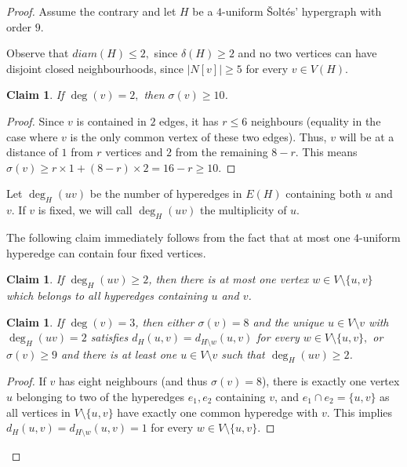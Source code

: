 \documentclass[a4paper,11pt]{article}
\newcommand*{\abs}[1]{\lvert #1\rvert}
\newcommand{\diam}{diam}
\newtheorem{claim}[defi]{Claim}
\newcommand*{\myproofname}{Proof}
\newenvironment{claimproof}[1][\myproofname]{\begin{proof}[#1]\renewcommand*{\qedsymbol}{\(\diamondsuit\)}}{\end{proof}}
\begin{document}
\begin{proof}
    Assume the contrary and let $H$ be a $4$-uniform \v Solt\'es' hypergraph with order $9$.

    Observe that $\diam(H)\le 2,$ since $\delta(H)\ge 2$ and no two vertices can have disjoint closed neighbourhoods, since $\abs{N[v]}\ge 5$ for every $v\in V(H).$ 


    \begin{claim}\label{clm:claimdeg2}
        If $\deg(v)=2,$ then $\sigma(v)\ge 10$. 
    \end{claim}
    \begin{claimproof}
        Since $v$ is contained in $2$ edges, it has $r \le 6$ neighbours (equality in the case where $v$ is the only common vertex of these two edges). Thus, $v$ will be at a distance of $1$ from $r$ vertices and $2$ from the remaining $8-r$. This means $\sigma(v)\ge r\times 1+(8-r)\times2=16-r \ge 10$.
    \end{claimproof}

    Let $\deg_H(uv)$ be the number of hyperedges in $E(H)$ containing both $u$ and $v$. If $v$ is fixed, we will call $\deg_H(uv)$ the multiplicity of $u$.

    
    The following claim immediately follows from the fact that at most one $4$-uniform hyperedge can contain four fixed vertices.

\begin{claim}\label{clm:deg(uv)gexuv-1}
    If $\deg_H(uv)\ge 2$, then there is at most one vertex $w \in V \setminus \{u,v\}$ which belongs to all hyperedges containing $u$ and $v$.
\end{claim}

    \begin{claim}\label{clm:claimdeg3}
        If $\deg(v)=3$, then either $\sigma(v)=8$ and the unique $u \in V \setminus v$ with $\deg_H(uv)= 2$ satisfies $d_H(u,v)=d_{H \setminus w}(u,v)$ for every $w \in V \setminus \{u,v\},$ or $\sigma(v)\ge 9$ and there is at least one $u \in V \setminus v$ such that $\deg_H(uv)\ge 2$.
    \end{claim}
    \begin{claimproof}
        If $v$ has eight neighbours (and thus $\sigma(v)=8$), there is exactly one vertex $u$ belonging to two of the hyperedges $e_1, e_2$ containing $v$, and $e_1 \cap e_2 =\{u,v\}$ as all vertices in $V \setminus \{u,v\}$ have exactly one common hyperedge with $v$. This implies $d_H(u,v)=d_{H \setminus w}(u,v)=1$ for every $w \in V \setminus \{u,v\}.$


\end{claimproof}
\end{proof}
\end{document}
